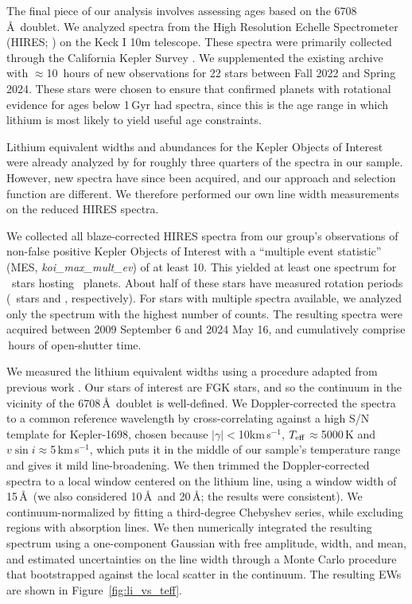\documentclass[11pt,twocolumn,tighten]{aastex63}
\newcommand{\kms}{{km\,s$^{-1}$}}
\begin{document}
The final piece of our analysis involves assessing ages based on the
 6708\,\AA\ doublet.  We analyzed spectra
from the High Resolution Echelle Spectrometer (HIRES;
\citealt{vogt_hires_1994}) on the Keck I 10m telescope.  These spectra
were primarily collected through the California Kepler Survey
\citep{2017AJ....154..107P,2017AJ....154..108J,2017AJ....154..109F}.
We supplemented the existing archive with $\approx$10~hours of new
observations for 22 stars between Fall 2022 and Spring 2024.  These
stars were chosen to ensure that confirmed planets with rotational
evidence for ages below 1\,Gyr had spectra, since this is the age
range in which lithium is most likely to yield useful age constraints.

Lithium equivalent widths and abundances for the Kepler Objects of
Interest were already analyzed by \citet{2018ApJ...855..115B} for
roughly three quarters of the spectra in our sample.  However, new
spectra have since been acquired, and our approach and selection
function are different.  We therefore performed our own line width
measurements on
the reduced HIRES spectra.

We collected all blaze-corrected HIRES spectra from our group's
observations of non-false positive Kepler Objects of Interest with a
``multiple event statistic'' (MES, {\it koi\_max\_mult\_ev}) of at
least 10.  This yielded at least one spectrum for \nstwithspec\
stars hosting \nplwithspec\ planets.  About half of these stars have
measured rotation periods (\nstwithspecandprot\ stars and
\nplwithspecandprot, respectively).   For stars with multiple spectra
available, we analyzed only
the spectrum with the highest number of counts.  The resulting spectra
were acquired between 2009 September 6 and 2024 May 16, and
cumulatively comprise \nhireshours\,hours of open-shutter time.

We measured the lithium equivalent widths using a procedure adapted
from previous work \citep{Bouma_2021}.  Our stars of interest are FGK
stars, and so the continuum in the vicinity of the \ion{Li}{1}
6708\,\AA\ doublet is well-defined.  We Doppler-corrected the spectra
to a common reference wavelength by cross-correlating against a high
S/N template for Kepler-1698, chosen because $|\gamma|$$<$10\kms,
$T_{\rm eff}$$\approx$5000\,K and $v\sin i$$\approx$5\,\kms, which
puts it in the middle of our sample's temperature range and gives it
mild line-broadening.  We then trimmed the Doppler-corrected spectra
to a local window centered on the lithium line, using a window width
of 15\,\AA\ (we also considered 10\,\AA\ and 20\,\AA; the results were
consistent).  We continuum-normalized by fitting a third-degree
Chebyshev series, while excluding regions with absorption lines.  We
then numerically integrated the resulting spectrum using a
one-component Gaussian with free amplitude, width, and mean, and
estimated uncertainties on the line width through a Monte Carlo
procedure that bootstrapped against the local scatter in the continuum.
The resulting EWs are shown in Figure~\ref{fig:li_vs_teff}.
\end{document}
